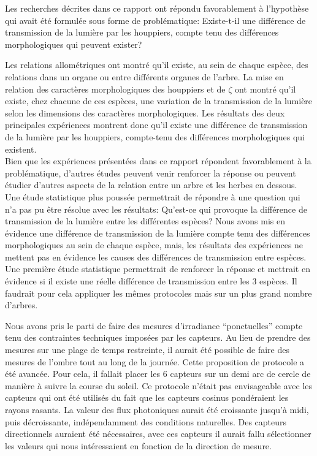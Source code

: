 \documentclass[12pt]{report}
\begin{document}
Les recherches décrites dans ce rapport ont répondu favorablement à l'hypothèse
qui avait été formulée sous forme de problématique: Existe-t-il une différence de
transmission de la lumière par les houppiers, compte tenu des différences
morphologiques qui peuvent exister?

Les relations allométriques ont montré qu'il existe, au sein de chaque espèce,
des relations dans un organe ou entre différents organes de l'arbre. La
mise en relation des caractères morphologiques des houppiers et de $\zeta$
ont montré qu'il existe, chez chacune de ces espèces, une variation de la
transmission de la lumière selon les dimensions des caractères morphologiques.
Les résultats des deux principales expériences montrent donc qu'il existe une
différence de transmission de la lumière par les houppiers, compte-tenu des
différences morphologiques qui existent.\\

Bien que les expériences présentées dans ce rapport répondent favorablement à
la problématique, d'autres études peuvent venir renforcer la réponse ou peuvent
étudier d'autres aspects de la relation entre un arbre et les herbes en dessous.
Une étude statistique plus poussée permettrait de répondre à une question qui
n'a pas pu être résolue avec les résultats: Qu'est-ce qui provoque la différence
de transmission de la lumière entre les différentes espèces? Nous avons mis en
évidence une différence de transmission de la lumière compte tenu des
différences morphologiques au sein de chaque espèce, mais, les résultats des
expériences ne mettent pas en évidence les causes des différences de
transmission entre espèces. Une première étude statistique permettrait de
renforcer la réponse et mettrait en évidence si il existe une réelle différence
de transmission entre les 3 espèces. Il faudrait pour cela appliquer les mêmes
protocoles mais sur un plus grand nombre d'arbres.

Nous avons pris le parti de faire des mesures d'irradiance ``ponctuelles''
compte tenu des contraintes techniques imposées par les capteurs. Au lieu de
prendre des mesures sur une plage de temps restreinte, il aurait été possible de
faire des mesures de l'ombre tout au long de la journée. Cette proposition
de protocole a été avancée. Pour cela, il fallait placer les 6 capteurs sur un
demi arc de cercle de manière à suivre la course du soleil. Ce protocole n'était
pas envisageable avec les capteurs qui ont été utilisés du fait que les capteurs
cosinus pondéraient les rayons rasants. La valeur des flux photoniques aurait
été croissante jusqu'à midi, puis décroissante, indépendamment des conditions
naturelles. Des capteurs directionnels auraient été nécessaires, avec ces
capteurs il aurait fallu sélectionner les valeurs qui nous intéressaient en
fonction de la direction de mesure.
\end{document}
